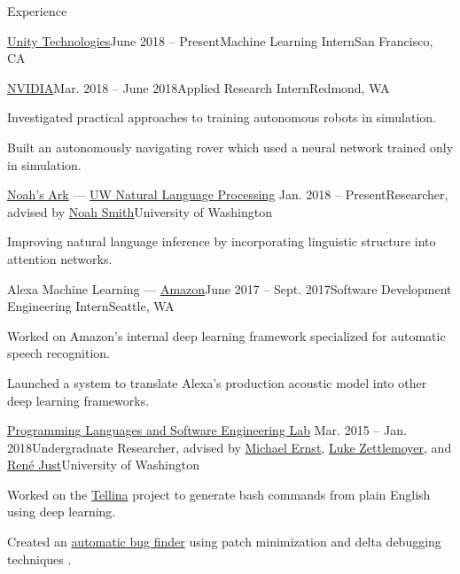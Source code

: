 \documentclass{resume}
\begin{document}
\begin{rSection}{Experience}
  \begin{rSubheader}{{\href{https://unity3d.ai/}{Unity Technologies}}}{June 2018 -- Present}{Machine Learning Intern}{San Francisco, CA}
  \end{rSubheader}

  \begin{rSubsection}{{\href{http://www.nvidia.com/page/home.html}{NVIDIA}}}{Mar. 2018 -- June 2018}{Applied Research Intern}{Redmond, WA}
    \item Investigated practical approaches to training autonomous robots in simulation.
    \item Built an autonomously navigating rover which used a neural network trained only in simulation.
  \end{rSubsection}

  \begin{rSubsection}{\href{http://www.ark.cs.washington.edu/}{Noah's Ark} --- \href{https://nlp.washington.edu/}{UW Natural Language Processing}}
    {Jan. 2018 -- Present}{Researcher, advised by \href{https://homes.cs.washington.edu/~nasmith/}{Noah Smith}}{University of Washington}
    \item Improving natural language inference by incorporating linguistic structure into attention networks.
  \end{rSubsection}

  \begin{rSubsection}{Alexa Machine Learning --- {\href{https://www.amazon.com/}{Amazon}}}{June 2017 -- Sept. 2017}{Software Development Engineering Intern}{Seattle, WA}
    \item Worked on Amazon's internal deep learning framework specialized for automatic
    speech recognition.
    \item Launched a system to translate Alexa's production acoustic model into other deep learning frameworks.
  \end{rSubsection}

  \begin{rSubsection}{\href{https://uwplse.org/}{Programming Languages and Software Engineering Lab}}
    {Mar. 2015 -- Jan. 2018}{Undergraduate Researcher, advised by \href{https://homes.cs.washington.edu/~mernst/}{Michael Ernst}, \href{https://www.cs.washington.edu/people/faculty/lsz}{Luke Zettlemoyer}, and \href{https://people.cs.umass.edu/~rjust/}{Ren{\'e} Just}}{University of Washington}
  \item Worked on the \href{https://github.com/TellinaTool}{Tellina} project \citep{LinWPVZE2017:TR} to generate bash commands from plain English using deep learning.
  \item Created an \href{https://github.com/dericp/patch-minimization}{automatic bug finder} using patch minimization and delta debugging techniques \citep{PearsonCJFAEPK2017}.
  \end{rSubsection}
  

\end{rSection}
\end{document}
